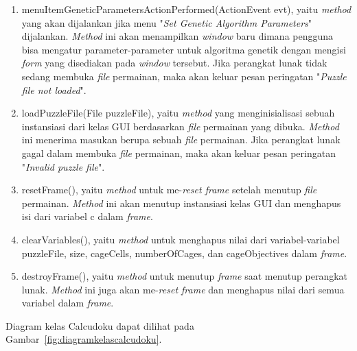 \begin{enumerate}
\item menuItemGeneticParametersActionPerformed(ActionEvent evt), yaitu \textit{method} yang akan dijalankan jika menu "\textit{Set Genetic Algorithm Parameters}" dijalankan. \textit{Method} ini akan menampilkan \textit{window} baru dimana pengguna bisa mengatur parameter-parameter untuk algoritma genetik dengan mengisi \textit{form} yang disediakan pada \textit{window} tersebut. Jika perangkat lunak tidak sedang membuka \textit{file} permainan, maka akan keluar pesan peringatan "\textit{Puzzle file not loaded}".
\item loadPuzzleFile(File puzzleFile), yaitu \textit{method} yang menginisialisasi sebuah instansiasi dari kelas GUI berdasarkan \textit{file} permainan yang dibuka. \textit{Method} ini menerima masukan berupa sebuah \textit{file} permainan. Jika perangkat lunak gagal dalam membuka \textit{file} permainan, maka akan keluar pesan peringatan "\textit{Invalid puzzle file}".
\item resetFrame(), yaitu \textit{method} untuk me-\textit{reset frame} setelah menutup \textit{file} permainan. \textit{Method} ini akan menutup instansiasi kelas GUI dan menghapus isi dari variabel c dalam \textit{frame}.
\item clearVariables(), yaitu \textit{method} untuk menghapus nilai dari variabel-variabel puzzleFile, size, cageCells, numberOfCages, dan cageObjectives dalam \textit{frame}.
\item destroyFrame(), yaitu \textit{method} untuk menutup \textit{frame} saat menutup perangkat lunak. \textit{Method} ini juga akan me-\textit{reset frame} dan menghapus nilai dari semua variabel dalam \textit{frame}.
\end{enumerate}

Diagram kelas Calcudoku dapat dilihat pada Gambar~\ref{fig:diagramkelascalcudoku}.

